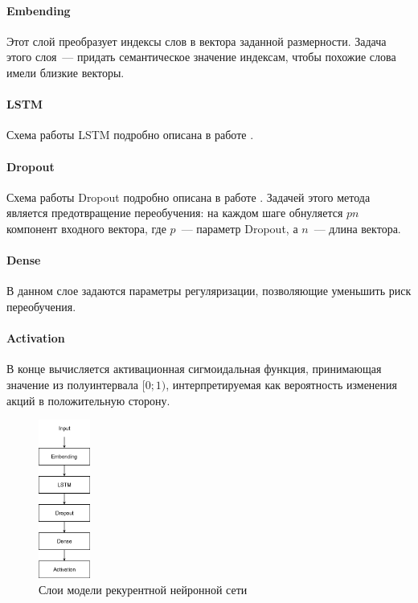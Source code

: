 \documentclass[14pt]{matmex-diploma-custom}
\begin{document}
\paragraph{Embending}

Этот слой преобразует индексы слов в вектора заданной размерности. Задача этого слоя~--- придать семантическое значение индексам, чтобы похожие слова имели близкие векторы.

\paragraph{LSTM}

Схема работы LSTM подробно описана в работе \cite{tools:lstm}.

\paragraph{Dropout}

Схема работы Dropout подробно описана в работе \cite{tools:dropout}. Задачей этого метода является предотвращение переобучения: на каждом шаге обнуляется $pn$ компонент входного вектора, где $p$~--- параметр Dropout, а $n$~--- длина вектора.

\paragraph{Dense}

В данном слое задаются параметры регуляризации, позволяющие уменьшить риск переобучения.

\paragraph{Activation}

В конце вычисляется активационная сигмоидальная функция, принимающая значение из полуинтервала $[0;1)$, интерпретируемая как вероятность изменения акций в положительную сторону.

\begin{figure}[h]
\centering
\includegraphics[width=0.15\textwidth]{img/layers}
\caption{Слои модели рекурентной нейронной сети}
\label{img:layers}
\end{figure}
\end{document}
